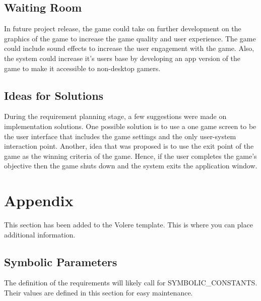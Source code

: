 \documentclass[12pt, titlepage]{article}
\begin{document}
\subsection{Waiting Room} 

In future project release, the game could take on further development on the graphics of the game to increase the game quality and user experience. The game could include sound effects to increase the user engagement with the game. Also, the system could increase it's users base by developing an app version of the game to make it accessible to non-desktop gamers. 

\subsection{Ideas for Solutions}

During the requirement planning stage, a few suggestions were made on implementation solutions. One possible solution is to use a one game screen to be the user interface that includes the game settings and the only user-system interaction point. Another, idea that was proposed is to use the exit point of the game as the winning criteria of the game. Hence, if the user completes the game's objective then the game shuts down and the system exits the application window. 





\newpage

\section{Appendix}

This section has been added to the Volere template.  This is where you can place
additional information.

\subsection{Symbolic Parameters}

The definition of the requirements will likely call for SYMBOLIC\_CONSTANTS.
Their values are defined in this section for easy maintenance.
\end{document}

